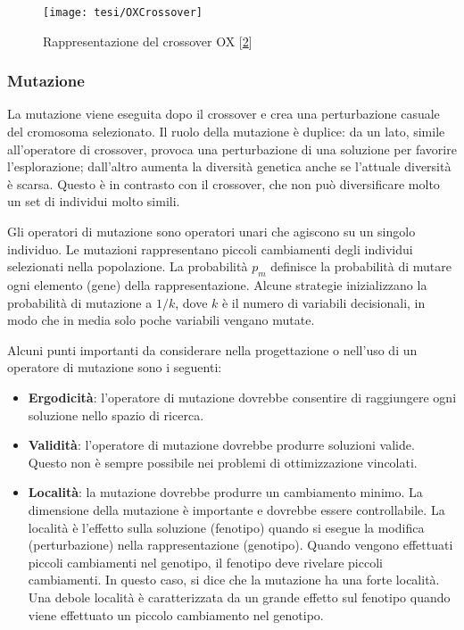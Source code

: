 \begin{figure}[!ht] 
    \centering 
    \texttt{[image: tesi/OXCrossover]} 
    \caption[Rappresentazione del crossover OX]{Rappresentazione del crossover OX [\hyperlink{bibliografia}{2}]}
\end{figure}

\subsubsection{Mutazione}
La mutazione viene eseguita dopo il crossover e crea una perturbazione casuale del cromosoma selezionato. Il ruolo della mutazione è duplice: da un lato, simile all'operatore di crossover, provoca una perturbazione di una soluzione per favorire l'esplorazione; dall'altro aumenta la diversità genetica anche se l'attuale diversità è scarsa. Questo è in contrasto con il crossover, che non può diversificare molto un set di individui molto simili.

Gli operatori di mutazione sono operatori unari che agiscono su un singolo individuo. Le mutazioni rappresentano piccoli cambiamenti degli individui selezionati nella popolazione. La probabilità $p_m$ definisce la probabilità di mutare ogni elemento (gene) della rappresentazione. Alcune strategie inizializzano la probabilità di mutazione a $1/k$, dove $k$ è il numero di variabili decisionali, in modo che in media solo poche variabili vengano mutate.

Alcuni punti importanti da considerare nella progettazione o nell'uso di un operatore di mutazione sono i seguenti:

\begin{itemize}
    \item \textbf{Ergodicità}: l'operatore di mutazione dovrebbe consentire di raggiungere ogni soluzione nello spazio di ricerca.
    \item \textbf{Validità}: l'operatore di mutazione dovrebbe produrre soluzioni valide. Questo non è sempre possibile nei problemi di ottimizzazione vincolati.
    \item \textbf{Località}: la mutazione dovrebbe produrre un cambiamento minimo. La dimensione della mutazione è importante e dovrebbe essere controllabile. La località è l'effetto sulla soluzione (fenotipo) quando si esegue la modifica (perturbazione) nella rappresentazione (genotipo). Quando vengono effettuati piccoli cambiamenti nel genotipo, il fenotipo deve rivelare piccoli cambiamenti. In questo caso, si dice che la mutazione ha una forte località. Una debole località è caratterizzata da un grande effetto sul fenotipo quando viene effettuato un piccolo cambiamento nel genotipo.
\end{itemize}

